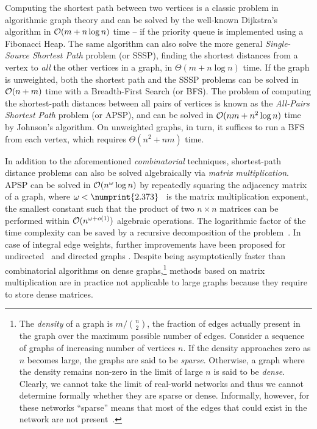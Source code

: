 Computing the shortest path between two vertices is a classic problem in
algorithmic graph theory and can be solved by the well-known Dijkstra's
algorithm in $\mathcal{O}(m + n\log n)$ time -- if the priority queue is implemented
using a Fibonacci Heap.
The same algorithm can also solve the more general \emph{Single-Source Shortest Path}
problem (or SSSP), \ie finding the shortest distances from a vertex to \emph{all}
the other vertices in a graph, in $\Theta(m + n\log n)$ time. If the graph is
unweighted, both the shortest path and the SSSP problems can be solved in $\mathcal{O}(n +
m)$ time with a Breadth-First Search (or BFS). The problem of computing the
shortest-path distances between all pairs of vertices is known as the
\emph{All-Pairs Shortest Path} problem (or APSP), and can be solved in $\mathcal{O}(nm +
n^2\log n)$ time by  Johnson's algorithm. On
unweighted graphs, in turn, it suffices to run a BFS from each vertex, which
requires $\Theta(n^2 + nm)$ time.

In addition to the aforementioned \emph{combinatorial} techniques,
shortest-path distance problems can also be solved algebraically via
\emph{matrix multiplication}. APSP can be solved in $\mathcal{O}(n^\omega \log n)$ by
repeatedly squaring the adjacency matrix of a graph, where $\omega <
\numprint{2.373}$~\cite{DBLP:conf/soda/AlmanW21}
is the matrix multiplication exponent, \ie the smallest constant such that the
product of two $n\times n$ matrices can be performed within $\mathcal{O}(n^{\omega +
o(1)})$ algebraic operations.
The logarithmic factor of the time complexity can be saved by a recursive
decomposition of the problem~\cite[Theorem 5.7, p. 204]{DBLP:books/aw/AhoHU74}.
In case of integral edge weights, further improvements have been proposed
for undirected~\cite{DBLP:conf/focs/ShoshanZ99} and directed graphs
\cite{DBLP:conf/focs/Zwick98,DBLP:conf/stoc/Zwick99}.
Despite being asymptotically faster than combinatorial algorithms on dense
graphs,\footnote{The \emph{density} of a graph is $m / {n \choose 2}$,
\ie the fraction of edges actually present in the graph over the maximum
possible number of edges. Consider a sequence of graphs of increasing number
of vertices $n$. If the density approaches zero as $n$ becomes large, the
graphs are said to be \emph{sparse}. Otherwise, a graph where the density
remains non-zero in the limit of large $n$ is said to be
\emph{dense}. Clearly, we cannot take the limit of real-world networks and thus
we cannot determine formally whether they are sparse or dense.
Informally, however, for these networks \enquote{sparse} means that most of
the edges that could exist in the network are not present~\cite[Section
6.10.1]{newman2018networks}.}
methods based on matrix multiplication are in practice not applicable to large
graphs because they require to store dense matrices.



